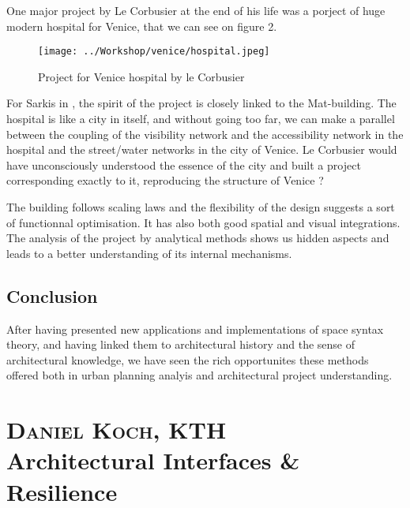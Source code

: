 \documentclass[english]{article}
\newcommand{\noun}[1]{\textsc{#1}}
\begin{document}
One major project by Le Corbusier at the end of his life was a porject
of huge modern hospital for Venice, that we can see on figure 2.

\begin{figure}
\hfill{}\texttt{[image: ../Workshop/venice/hospital.jpeg]}\hfill{}\hfill{}\caption{Project for Venice hospital by le Corbusier}


\end{figure}


\bigskip{}


For Sarkis in \cite{sarkis2001corbusier}, the spirit of the project
is closely linked to the Mat-building. The hospital is like a city
in itself, and without going too far, we can make a parallel between
the coupling of the visibility network and the accessibility network
in the hospital and the street/water networks in the city of Venice.
Le Corbusier would have unconsciously understood the essence of the
city and built a project corresponding exactly to it, reproducing
the structure of Venice ?

\bigskip{}


The building follows scaling laws and the flexibility of the design
suggests a sort of functionnal optimisation. It has also both good
spatial and visual integrations. The analysis of the project by analytical
methods shows us hidden aspects and leads to a better understanding
of its internal mechanisms.\bigskip{}
\bigskip{}



\subsection*{Conclusion}

After having presented new applications and implementations of space
syntax theory, and having linked them to architectural history and
the sense of architectural knowledge, we have seen the rich opportunites
these methods offered both in urban planning analyis and architectural
project understanding.

\newpage{}


\section*{\noun{Daniel Koch}, KTH\protect \\
Architectural Interfaces \& Resilience}

\bigskip{}
\bigskip{}
\bigskip{}
\bigskip{}
\end{document}
